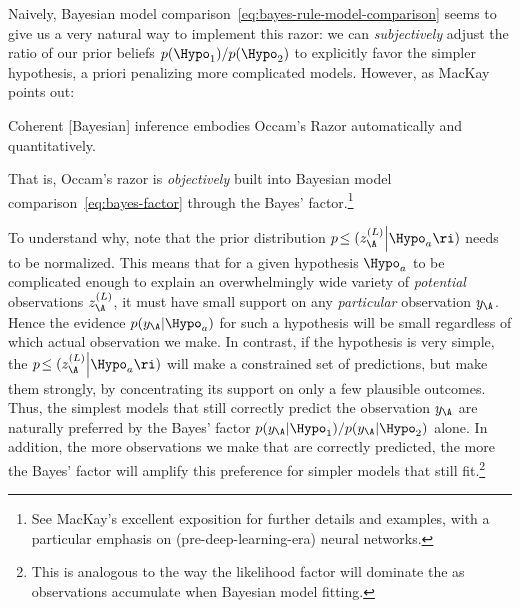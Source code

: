 Naively, Bayesian model comparison~\eqref{eq:bayes-rule-model-comparison} seems to give us a very natural way to implement this razor: we can \emph{subjectively} adjust the ratio of our prior beliefs $p(\Hypo_1) / p(\Hypo_2)$ to explicitly favor the simpler hypothesis, a priori penalizing more complicated models. However, as MacKay \cite{mackay1995probable} points out:

\vspace{-.30\baselineskip}
\setlength{}
\epigraph{Coherent [Bayesian] inference embodies Occam's Razor automatically and quantitatively.}{}
\setlength{}

\vspace{-1.80\baselineskip}
\noindent{}That is, Occam's razor is \emph{objectively} built into Bayesian model comparison~\eqref{eq:bayes-factor} through the Bayes' factor.\footnote{
See MacKay's excellent exposition \cite{mackay1995probable} for further details and examples,
with a particular emphasis on (pre-deep-learning-era) neural networks.
}



To understand why,
note that the prior distribution $p\!\le(z_\A^{(L)} \Big\vert \Hypo_{a}\ri)$
needs to be normalized. This means that for a given hypothesis $\Hypo_{a}$
to be complicated enough to explain an overwhelmingly wide variety of \emph{potential} observations $z_\A^{(L)}$, it must have small support on any \emph{particular} observation $y_\A$.
Hence the evidence $p(y_\A \vert \Hypo_{a})$  for such a hypothesis
will be small regardless of which actual observation we make.
In contrast, if the hypothesis is very simple, the  $p\!\le(z_\A^{(L)} \Big\vert \Hypo_{a}\ri)$ will make a constrained set of predictions, but make them strongly, by concentrating its support on only a few plausible outcomes. Thus, the simplest models that still correctly predict the observation $y_{\A}$ are naturally preferred by the Bayes' factor $p(y_\A \vert \Hypo_{1}) / p(y_\A \vert \Hypo_{2})$ alone. In addition, the more observations we make that are correctly predicted, the more the Bayes' factor will amplify this preference for simpler models that still fit.\footnote{This is analogous to the way the likelihood factor will dominate the  as observations accumulate when Bayesian model fitting.}











